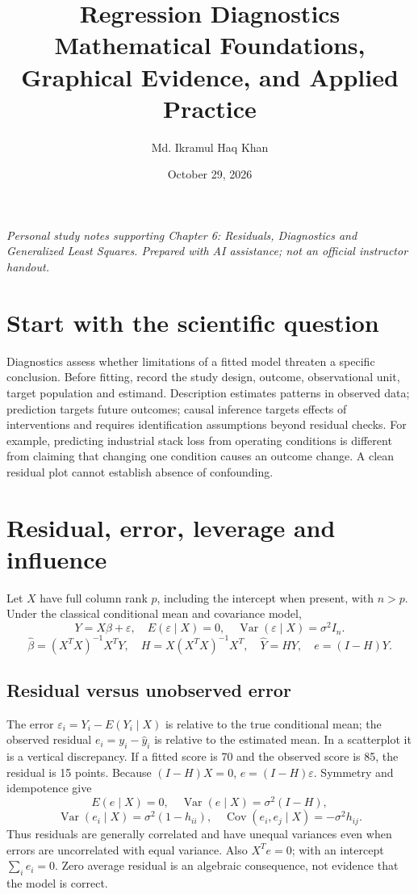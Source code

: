 \documentclass[11pt]{article}
\title{Regression Diagnostics\\\large Mathematical Foundations, Graphical Evidence, and Applied Practice}
\author{Md. Ikramul Haq Khan}
\date{October 29, 2026}
\begin{document}
\maketitle
\textit{Personal study notes supporting Chapter 6: Residuals, Diagnostics and Generalized Least Squares. Prepared with AI assistance; not an official instructor handout.}
\tableofcontents
\section{Start with the scientific question}
Diagnostics assess whether limitations of a fitted model threaten a specific conclusion. Before fitting, record the study design, outcome, observational unit, target population and estimand. Description estimates patterns in observed data; prediction targets future outcomes; causal inference targets effects of interventions and requires identification assumptions beyond residual checks.
For example, predicting industrial stack loss from operating conditions is different from claiming that changing one condition causes an outcome change. A clean residual plot cannot establish absence of confounding.
\section{Residual, error, leverage and influence}
Let $X$ have full column rank $p$, including the intercept when present, with $n>p$. Under the classical conditional mean and covariance model,
\[Y=X\beta+\varepsilon,\quad E(\varepsilon\mid X)=0,\quad\operatorname{Var}(\varepsilon\mid X)=\sigma^2I_n.\]
\[\widehat\beta=(X^TX)^{-1}X^TY,\quad H=X(X^TX)^{-1}X^T,\quad \widehat Y=HY,\quad e=(I-H)Y.\]
\subsection{Residual versus unobserved error}
The error $\varepsilon_i=Y_i-E(Y_i\mid X)$ is relative to the true conditional mean; the observed residual $e_i=y_i-\widehat y_i$ is relative to the estimated mean. In a scatterplot it is a vertical discrepancy. If a fitted score is 70 and the observed score is 85, the residual is 15 points.
Because $(I-H)X=0$, $e=(I-H)\varepsilon$. Symmetry and idempotence give
\[E(e\mid X)=0,\quad\operatorname{Var}(e\mid X)=\sigma^2(I-H),\]
\[\operatorname{Var}(e_i\mid X)=\sigma^2(1-h_{ii}),\quad\operatorname{Cov}(e_i,e_j\mid X)=-\sigma^2h_{ij}.\]
Thus residuals are generally correlated and have unequal variances even when errors are uncorrelated with equal variance. Also $X^Te=0$; with an intercept $\sum_i e_i=0$. Zero average residual is an algebraic consequence, not evidence that the model is correct.
\end{document}
